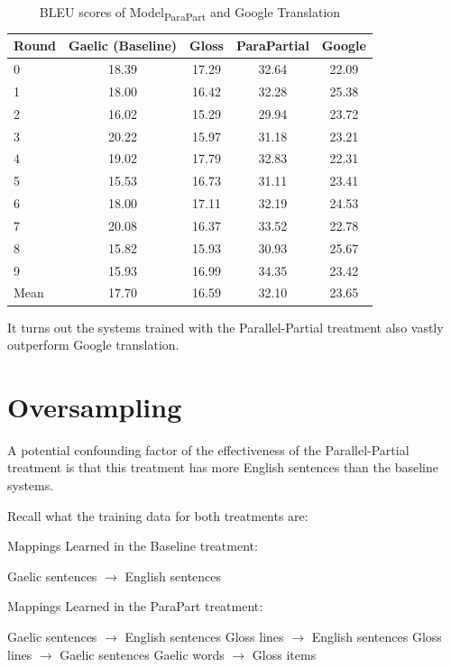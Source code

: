 \documentclass[final]{ua-thesis}
\numberwithin{equation}{section}
\begin{document}
\begin{table}[ht]
\centering
\begin{tabular}{lcccc}
  \hline
Round & Gaelic (Baseline) & Gloss & ParaPartial & Google \\ 
  \hline
0 & 18.39 & 17.29 & 32.64 & 22.09 \\ 
  1 & 18.00 & 16.42 & 32.28 & 25.38 \\ 
  2 & 16.02 & 15.29 & 29.94 & 23.72 \\ 
  3 & 20.22 & 15.97 & 31.18 & 23.21 \\ 
  4 & 19.02 & 17.79 & 32.83 & 22.31 \\ 
  5 & 15.53 & 16.73 & 31.11 & 23.41 \\ 
  6 & 18.00 & 17.11 & 32.19 & 24.53 \\ 
  7 & 20.08 & 16.37 & 33.52 & 22.78 \\ 
  8 & 15.82 & 15.93 & 30.93 & 25.67 \\ 
  9 & 15.93 & 16.99 & 34.35 & 23.42 \\ 
   \hline
Mean & 17.70 & 16.59 & 32.10 & 23.65 \\ 
   \hline
\end{tabular}
\caption{BLEU scores of Model\textsubscript{ParaPart} and Google Translation} 
\label{Table:google}
\end{table}
It turns out the systems trained with the Parallel-Partial treatment also vastly outperform Google translation.   

\section{Oversampling}
A potential confounding factor of the effectiveness of the Parallel-Partial treatment is that this treatment has more English sentences than the baseline systems. 

Recall what the training data for both treatments are: 

\begin{exe}
	\ex Mappings Learned in the Baseline treatment:
	\begin{xlist}
		\ex Gaelic sentences $\rightarrow$ English sentences
	\end{xlist}	
	\ex Mappings Learned in the ParaPart treatment:
	\begin{xlist}
		\ex \label{over1} Gaelic sentences $\rightarrow$ English sentences
		\ex \label{over2} Gloss lines $\rightarrow$ English sentences
		\ex Gloss lines $\rightarrow$ Gaelic sentences
		\ex Gaelic words $\rightarrow$ Gloss items
	\end{xlist}	
\end{exe}    
\end{document}
